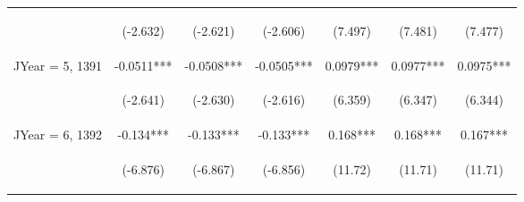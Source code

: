 \documentclass[]{standalone}
\begin{document}
\begin{tabular}{lcccccc}
    \vspace{4pt}     & \begin{footnotesize}(-2.632)\end{footnotesize} & \begin{footnotesize}(-2.621)\end{footnotesize} & \begin{footnotesize}(-2.606)\end{footnotesize} & \begin{footnotesize}(7.497)\end{footnotesize}  & \begin{footnotesize}(7.481)\end{footnotesize}  & \begin{footnotesize}(7.477)\end{footnotesize}  \\
    JYear = 5, 1391  & -0.0511***                                     & -0.0508***                                     & -0.0505***                                     & 0.0979***                                      & 0.0977***                                      & 0.0975***                                      \\
    \vspace{4pt}     & \begin{footnotesize}(-2.641)\end{footnotesize} & \begin{footnotesize}(-2.630)\end{footnotesize} & \begin{footnotesize}(-2.616)\end{footnotesize} & \begin{footnotesize}(6.359)\end{footnotesize}  & \begin{footnotesize}(6.347)\end{footnotesize}  & \begin{footnotesize}(6.344)\end{footnotesize}  \\
    JYear = 6, 1392  & -0.134***                                      & -0.133***                                      & -0.133***                                      & 0.168***                                       & 0.168***                                       & 0.167***                                       \\
    \vspace{4pt}     & \begin{footnotesize}(-6.876)\end{footnotesize} & \begin{footnotesize}(-6.867)\end{footnotesize} & \begin{footnotesize}(-6.856)\end{footnotesize} & \begin{footnotesize}(11.72)\end{footnotesize}  & \begin{footnotesize}(11.71)\end{footnotesize}  & \begin{footnotesize}(11.71)\end{footnotesize}  \\

\end{tabular}
\end{document}
